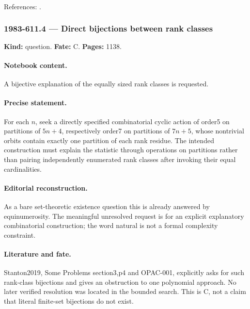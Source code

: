 \noindent References: \citep{atkinswinnertondyer1954partitions,stanton2019problems}.\par

\subsubsection{1983-611.4 --- Direct bijections between rank classes}

\label{item:1983-611.4}

\noindent\textbf{Kind:} question. \textbf{Fate:} C. \textbf{Pages:} 1138.\par

\paragraph{Notebook content.} A bijective explanation of the equally sized rank classes is requested.

\paragraph{Precise statement.} For each $n$, seek a directly specified combinatorial cyclic action of order5 on partitions of $5n+4$, respectively order7 on partitions of $7n+5$, whose nontrivial orbits contain exactly one partition of each rank residue. The intended construction must explain the statistic through operations on partitions rather than pairing independently enumerated rank classes after invoking their equal cardinalities.

\paragraph{Editorial reconstruction.} As a bare set-theoretic existence question this is already answered by equinumerosity. The meaningful unresolved request is for an explicit explanatory combinatorial construction; the word natural is not a formal complexity constraint.

\paragraph{Literature and fate.} Stanton2019, Some Problems section3,p4 and OPAC-001, explicitly asks for such rank-class bijections and gives an obstruction to one polynomial approach. No later verified resolution was located in the bounded search. This is C, not a claim that literal finite-set bijections do not exist.

